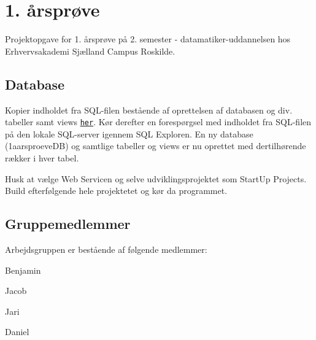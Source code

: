  \section*{1. årsprøve}

Projektopgave for 1. årsprøve på 2. semester -\/ datamatiker-\/uddannelsen hos Erhvervsakademi Sjælland Campus Roskilde.

\subsection*{Database}

Kopier indholdet fra S\+Q\+L-\/filen bestående af oprettelsen af databasen og div. tabeller samt views \href{1aarsproeve/1aarsproeve/database.sql}{\tt her}. Kør derefter en forespørgsel med indholdet fra S\+Q\+L-\/filen på den lokale S\+Q\+L-\/server igennem S\+Q\+L Exploren. En ny database (1aarsproeve\+D\+B) og samtlige tabeller og views er nu oprettet med dertilhørende rækker i hver tabel.

Husk at vælge Web Servicen og selve udviklingsprojektet som Start\+Up Projects. Build efterfølgende hele projektetet og kør da programmet.

\subsection*{Gruppemedlemmer}

Arbejdsgruppen er bestående af følgende medlemmer\+:
\begin{DoxyItemize}
\item Benjamin
\item Jacob
\item Jari
\item Daniel 
\end{DoxyItemize}